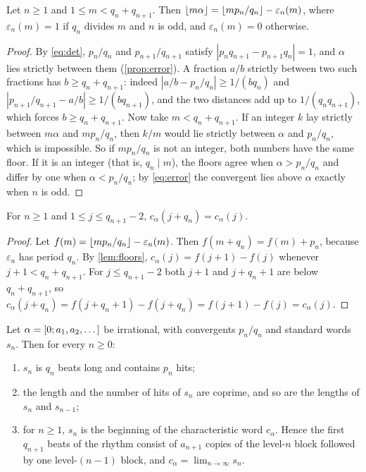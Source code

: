 \begin{lemma}\label{lem:floors}
Let $n \ge 1$ and $1 \le m < q_n + q_{n+1}$. Then $\left\lfloor m\alpha\right\rfloor = \left\lfloor m p_n/q_n\right\rfloor - \varepsilon_n(m)$, where $\varepsilon_n(m) = 1$ if $q_n$ divides $m$ and $n$ is odd, and $\varepsilon_n(m) = 0$ otherwise.
\end{lemma}

\begin{proof}
By \eqref{eq:det}, $p_n/q_n$ and $p_{n+1}/q_{n+1}$ satisfy $|p_n q_{n+1} - p_{n+1} q_n| = 1$, and $\alpha$ lies strictly between them (\cref{prop:error}). A fraction $a/b$ strictly between two such fractions has $b \ge q_n + q_{n+1}$: indeed $|a/b - p_n/q_n| \ge 1/(b q_n)$ and $|p_{n+1}/q_{n+1} - a/b| \ge 1/(b q_{n+1})$, and the two distances add up to $1/(q_n q_{n+1})$, which forces $b \ge q_n + q_{n+1}$. Now take $m < q_n + q_{n+1}$. If an integer $k$ lay strictly between $m\alpha$ and $m p_n/q_n$, then $k/m$ would lie strictly between $\alpha$ and $p_n/q_n$, which is impossible. So if $m p_n/q_n$ is not an integer, both numbers have the same floor. If it is an integer (that is, $q_n \mid m$), the floors agree when $\alpha > p_n/q_n$ and differ by one when $\alpha < p_n/q_n$; by \eqref{eq:error} the convergent lies above $\alpha$ exactly when $n$ is odd.
\end{proof}

\begin{lemma}\label{lem:period}
For $n \ge 1$ and $1 \le j \le q_{n+1} - 2$, $c_\alpha(j + q_n) = c_\alpha(j)$.
\end{lemma}

\begin{proof}
Let $f(m) = \left\lfloor m p_n/q_n\right\rfloor - \varepsilon_n(m)$. Then $f(m + q_n) = f(m) + p_n$, because $\varepsilon_n$ has period $q_n$. By \cref{lem:floors}, $c_\alpha(j) = f(j+1) - f(j)$ whenever $j + 1 < q_n + q_{n+1}$. For $j \le q_{n+1} - 2$ both $j+1$ and $j + q_n + 1$ are below $q_n + q_{n+1}$, so $c_\alpha(j+q_n) = f(j+q_n+1) - f(j+q_n) = f(j+1) - f(j) = c_\alpha(j)$.
\end{proof}

\begin{theorem}\label{thm:nested}
Let $\alpha = [0; a_1, a_2, \dots]$ be irrational, with convergents $p_n/q_n$ and standard words $s_n$. Then for every $n \ge 0$:
\begin{enumerate}[label=(\roman*)]
\item $s_n$ is $q_n$ beats long and contains $p_n$ hits;
\item the length and the number of hits of $s_n$ are coprime, and so are the lengths of $s_n$ and $s_{n-1}$;
\item for $n \ge 1$, $s_n$ is the beginning of the characteristic word $c_\alpha$. Hence the first $q_{n+1}$ beats of the rhythm consist of $a_{n+1}$ copies of the level-$n$ block followed by one level-$(n-1)$ block, and $c_\alpha = \lim_{n\to\infty} s_n$.
\end{enumerate}
\end{theorem}

